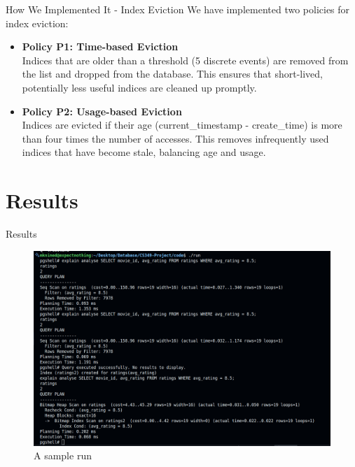 \documentclass[Serif, 10pt, brown]{beamer}
\theoremstyle{example}
\theoremstyle{plain}
\begin{document}
\begin{frame}{How We Implemented It - Index Eviction}
    We have implemented two policies for index eviction:
    \begin{itemize}
        \item \textbf{Policy P1: Time-based Eviction} \\
        Indices that are older than a threshold (5 discrete events) are removed from the list and dropped from the database. This ensures that short-lived, potentially less useful indices are cleaned up promptly.

        \item \textbf{Policy P2: Usage-based Eviction} \\
        Indices are evicted if their age (current\_timestamp - create\_time) is more than four times the number of accesses. This removes infrequently used indices that have become stale, balancing age and usage.
    \end{itemize}
\end{frame}


\section{Results}
\begin{frame}{Results}
	\begin{figure}
        \centering
        \includegraphics[width=1\linewidth]{../images/Screenshot from 2025-05-01 11-27-38.png}
        \caption{A sample run}
    \end{figure}
\end{frame}
\end{document}
